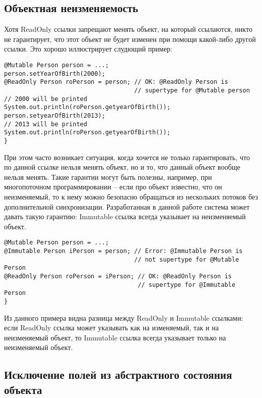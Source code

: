 \subsection{Объектная неизменяемость}

Хотя ReadOnly ссылки запрещают менять объект, на который ссылаются, никто не гарантирует, что этот объект не будет изменен при помощи какой-либо другой ссылки. Это хорошо иллюстрирует слудющий пример:

\begin{lstlisting}[caption=Изменение объекта\, хранимого по ReadOnly ссылке, label=code:change_ro_object]
@Mutable Person person = ...;
person.setYearOfBirth(2000);
@ReadOnly Person roPerson = person; // OK: @ReadOnly Person is 
                                    // supertype for @Mutable person
// 2000 will be printed
System.out.println(roPerson.getyearOfBirth());
person.setyearOfBirth(2013);
// 2013 will be printed
System.out.println(roPerson.getyearOfBirth()); 			
}
\end{lstlisting} 

При этом часто возникает ситуация, когда хочется не только гарантировать, что по данной ссылке нельзя менять объект, но и то, что данный объект вообще нельзя менять. Такие гарантии могут быть полезны, например, при многопоточном программировании -- если про объект известно, что он неизменяемый, то к нему можно безопасно обращаться из нескольких потоков без дополнительной синхронизации. Разработанная в данной работе система может давать такую гарантию: Immutable ссылка всегда указывает на неизменяемый объект. 

\begin{lstlisting}[caption=Mutable и Immutable ссылки, label=code:mutable_vs_immutable]
@Mutable Person person = ...;
@Immutable Person iPerson = person; // Error: @Immutable Person is 
                                    // not supertype for @Mutable Person
@ReadOnly Person roPerson = iPerson; // OK: @ReadOnly Person is 
                                     // supertype for @Immutable Person
}
\end{lstlisting} 

Из данного примера видна разница между ReadOnly и Immutable ссылками: если ReadOnly ссылка может указывать как на изменяемый, так и на неизменяемый объект, то Immutable ссылка всегда указывает только на неизменяемый объект.  

\subsection{Исключение полей из абстрактного состояния объекта}

